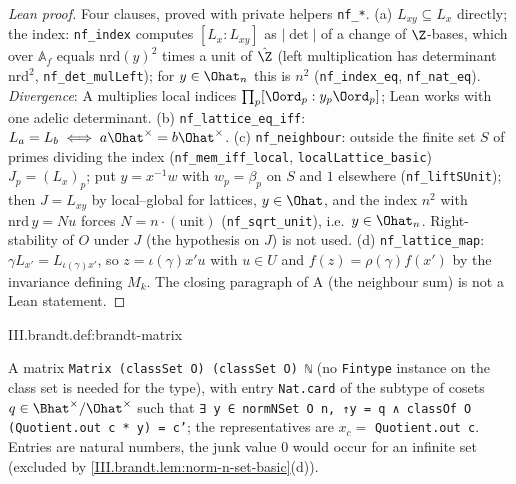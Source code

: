 \begin{proof}[Lean proof]
Four clauses, proved with private helpers \texttt{nf\_*}. (a) $L_{xy}\subseteq L_x$ directly; the index: \texttt{nf\_index} computes $[L_x:L_{xy}]$ as $|\det|$ of a change of $\Z$-bases, which over $\mathbb A_f$ equals $\mathrm{nrd}(y)^2$ times a unit of $\hat{\Z}$ (left multiplication has determinant $\mathrm{nrd}^2$, \texttt{nf\_det\_mulLeft}); for $y\in\Ohat_n$ this is $n^2$ (\texttt{nf\_index\_eq}, \texttt{nf\_nat\_eq}). \emph{Divergence}: A multiplies local indices $\prod_p[\Oord_p:y_p\Oord_p]$; Lean works with one adelic determinant. (b) \texttt{nf\_lattice\_eq\_iff}: $L_a=L_b\iff a\Ohat^\times=b\Ohat^\times$. (c) \texttt{nf\_neighbour}: outside the finite set $S$ of primes dividing the index (\texttt{nf\_mem\_iff\_local}, \texttt{localLattice\_basic}) $J_p=(L_x)_p$; put $y=x^{-1}w$ with $w_p=\beta_p$ on $S$ and $1$ elsewhere (\texttt{nf\_liftSUnit}); then $J=L_{xy}$ by local--global for lattices, $y\in\Ohat$, and the index $n^2$ with $\mathrm{nrd}\,y=Nu$ forces $N=n\cdot(\text{unit})$ (\texttt{nf\_sqrt\_unit}), i.e.\ $y\in\Ohat_n$. Right-stability of $O$ under $J$ (the hypothesis on $J$) is not used. (d) \texttt{nf\_lattice\_map}: $\gamma L_{x'}=L_{\iota(\gamma)x'}$, so $z=\iota(\gamma)x'u$ with $u\in U$ and $f(z)=\rho(\gamma)f(x')$ by the invariance defining $M_k$. The closing paragraph of A (the neighbour sum) is not a Lean statement.
\end{proof}

\begin{definition}
\end{definition}
\begin{tfformal}{III.brandt.def:brandt-matrix}
\begin{tffidelity}
A matrix \texttt{Matrix (classSet O) (classSet O) ℕ} (no \texttt{Fintype} instance on the class set is needed for the type), with entry \texttt{Nat.card} of the subtype of cosets $q\in\Bhat^\times/\Ohat^\times$ such that \texttt{∃ y ∈ normNSet O n, ↑y = q ∧ classOf O (Quotient.out c * y) = c'}; the representatives are $x_c=$ \texttt{Quotient.out c}. Entries are natural numbers, the junk value $0$ would occur for an infinite set (excluded by \cref{III.brandt.lem:norm-n-set-basic}(d)).
\end{tffidelity}
\end{tfformal}

